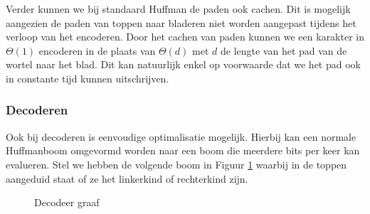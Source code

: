 \documentclass[twoside,twocolumn]{article}
\begin{document}
            Verder kunnen we bij standaard Huffman de paden ook cachen.
            Dit is mogelijk aangezien de paden van toppen naar bladeren niet worden aangepast tijdens het verloop van het encoderen.
            Door het cachen van paden kunnen we een karakter in $\Theta(1)$ encoderen in de plaats van $\Theta(d)$ met $d$ de lengte van het pad van de wortel naar het blad.
            Dit kan natuurlijk enkel op voorwaarde dat we het pad ook in constante tijd kunnen uitschrijven.
        \subsubsection{Decoderen} 
            Ook bij decoderen is eenvoudige optimalisatie mogelijk.
            Hierbij kan een normale Huffmanboom omgevormd worden naar een boom die meerdere bits per keer kan evalueren. 
            Stel we hebben de volgende boom in Figuur \ref{boom2} waarbij in de toppen aangeduid staat of ze het linkerkind of rechterkind zijn. 
            \begin{figure}[H]
                \begin{center}
                \end{center}
                \caption{Decodeer graaf}
                \label{decodeer-boom-simpel}

                \label{boom2}
            \end{figure}
\end{document}
